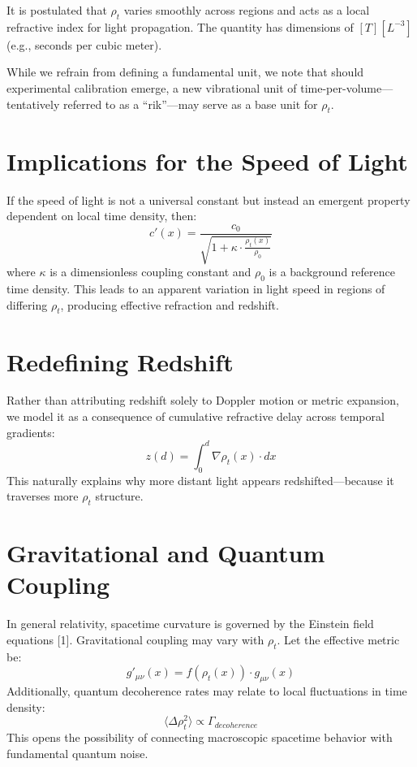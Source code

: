 \documentclass[12pt]{article}
\begin{document}
It is postulated that $\rho_t$ varies smoothly across regions and acts as a local refractive index for light propagation. The quantity has dimensions of $[T][L^{-3}]$ (e.g., seconds per cubic meter).

While we refrain from defining a fundamental unit, we note that should experimental calibration emerge, a new vibrational unit of time-per-volume—tentatively referred to as a “rik”—may serve as a base unit for $\rho_t$.

\section{Implications for the Speed of Light}
If the speed of light is not a universal constant but instead an emergent property dependent on local time density, then:
\[ c'(x) = \frac{c_0}{\sqrt{1 + \kappa \cdot \frac{\rho_t(x)}{\rho_0}}} \]
where \(\kappa\) is a dimensionless coupling constant and \(\rho_0\) is a background reference time density. This leads to an apparent variation in light speed in regions of differing $\rho_t$, producing effective refraction and redshift.

\section{Redefining Redshift}
Rather than attributing redshift solely to Doppler motion or metric expansion, we model it as a consequence of cumulative refractive delay across temporal gradients:
\[ z(d) = \int_0^d \nabla \rho_t(x) \cdot dx \]
This naturally explains why more distant light appears redshifted—because it traverses more $\rho_t$ structure.

\section{Gravitational and Quantum Coupling}
In general relativity, spacetime curvature is governed by the Einstein field equations [1].
Gravitational coupling may vary with $\rho_t$. Let the effective metric be:
\[ g'_{\mu\nu}(x) = f(\rho_t(x)) \cdot g_{\mu\nu}(x) \]
Additionally, quantum decoherence rates may relate to local fluctuations in time density:
\[ \langle \Delta \rho_t^2 \rangle \propto \Gamma_{decoherence} \]
This opens the possibility of connecting macroscopic spacetime behavior with fundamental quantum noise.
\end{document}
